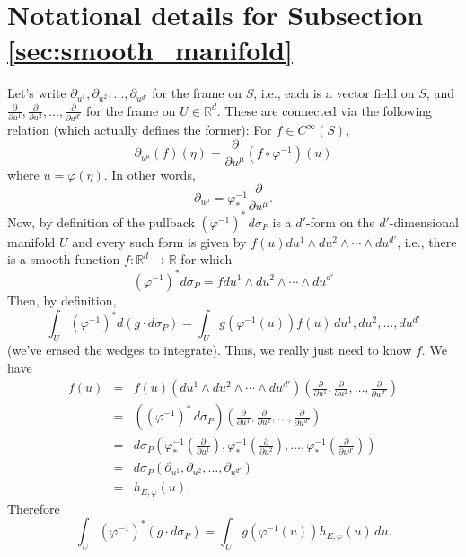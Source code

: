 \documentclass[11pt, letter]{book}
\begin{document}
\section{Notational details for Subsection \ref{sec:smooth_manifold} }
Let's write $\partial_{u^1},\partial_{u^2},\dots,\partial_{u^{d'}}$ for the frame on $S$, i.e., each is a vector field on $S$, and $\frac{\partial}{\partial u^1},\frac{\partial}{\partial u^2},\dots,\frac{\partial}{\partial u^{d'}}$ for the frame on $U\in\mathbb{R}^d$. These are connected via the following relation (which actually defines the former): For $f\in C^\infty(S)$, 
\begin{equation*}
    \partial_{u^\mu}(f)(\eta)=\frac{\partial}{\partial u^{\mu}}\left(f\circ\varphi^{-1}\right)(u)
\end{equation*}
where $u=\varphi(\eta)$. In other words,
\begin{equation*}
    \partial_{u^\mu}=\varphi^{-1}_*\frac{\partial}{\partial u^\mu}.
\end{equation*}
Now, by definition of the pullback $(\varphi^{-1})^*\,d\sigma_P$ is a $d'$-form on the $d'$-dimensional manifold $U$ and every such form is given by $f(u)du^1\wedge du^2\wedge\cdots\wedge du^{d'}$, i.e., there is a smooth function $f:\mathbb{R}^d\to\mathbb{R}$ for which
\begin{equation*}
    (\varphi^{-1})^*d\sigma_P=f du^1\wedge du^2\wedge\cdots\wedge du^{d'}
\end{equation*}
Then, by definition, 
\begin{equation*}
    \int_U (\varphi^{-1})^*d(g\cdot d\sigma_P)=\int_U g(\varphi^{-1}(u))f(u)\,du^1,du^2,\dots,du^{d'}
\end{equation*}
(we've erased the wedges to integrate). Thus, we really just need to know $f$. We have
\begin{eqnarray*}
    f(u)&=&f(u)\left(du^1\wedge du^2\wedge\cdots\wedge du^{d'}\right)\left(\frac{\partial}{\partial u^1},\frac{\partial}{\partial u^2},\dots,\frac{\partial}{\partial u^{d'}}\right)\\
    &=&\left((\varphi^{-1})^*\,d\sigma_P\right)\left(\frac{\partial}{\partial u^1},\frac{\partial}{\partial u^2},\dots,\frac{\partial}{\partial u^{d'}}\right)\\
    &=&d\sigma_P\left(\varphi^{-1}_*\left(\frac{\partial}{\partial u^1}\right),\varphi^{-1}_*\left(\frac{\partial}{\partial u^2}\right),\dots,\varphi^{-1}_*\left(\frac{\partial}{\partial u^{d'}}\right)\right)\\
    &=&d\sigma_P(\partial_{u^1},\partial_{u^2},\dots,\partial_{u^{d'}})\\
    &=&h_{E,\varphi}(u).
\end{eqnarray*}
Therefore
\begin{equation*}
    \int_U (\varphi^{-1})^*(g\cdot d\sigma_P)=\int_U g(\varphi^{-1}(u))h_{E,\varphi}(u)\,du.
\end{equation*}
\end{document}
